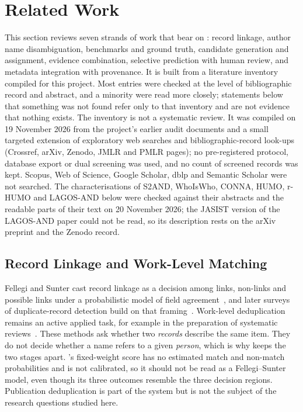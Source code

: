 \section{Related Work}
\label{sec:related}

This section reviews seven strands of work that bear on \hammer{}: record linkage, author name disambiguation, benchmarks and ground truth, candidate generation and assignment, evidence combination, selective prediction with human review, and metadata integration with provenance. It is built from a literature inventory compiled for this project. Most entries were checked at the level of bibliographic record and abstract, and a minority were read more closely; statements below that something was not found refer only to that inventory and are not evidence that nothing exists.
The inventory is not a systematic review. It was compiled on 19 November 2026 from the project's earlier audit documents and a small targeted extension of exploratory web searches and bibliographic-record look-ups (Crossref, arXiv, Zenodo, JMLR and PMLR pages); no pre-registered protocol, database export or dual screening was used, and no count of screened records was kept. Scopus, Web of Science, Google Scholar, dblp and Semantic Scholar were not searched. The characterisations of S2AND, WhoIsWho, CONNA, HUMO, r-HUMO and LAGOS-AND below were checked against their abstracts and the readable parts of their text on 20 November 2026; the JASIST version of the LAGOS-AND paper could not be read, so its description rests on the arXiv preprint and the Zenodo record.

\subsection{Record Linkage and Work-Level Matching}
Fellegi and Sunter cast record linkage as a decision among links, non-links and possible links under a probabilistic model of field agreement~\cite{fellegi1969recordlinkage}, and later surveys of duplicate-record detection build on that framing~\cite{elmagarmid2007duplicate}. Work-level deduplication remains an active applied task, for example in the preparation of systematic reviews~\cite{forbes2024deduplicator}. These methods ask whether two \emph{records} describe the same item. They do not decide whether a name refers to a given \emph{person}, which is why \hammer{} keeps the two stages apart. \hammer{}'s fixed-weight score has no estimated match and non-match probabilities and is not calibrated, so it should not be read as a Fellegi--Sunter model, even though its three outcomes resemble the three decision regions. Publication deduplication is part of the system but is not the subject of the research questions studied here.

